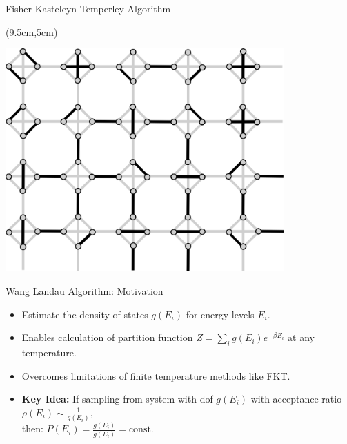 \documentclass{dfki}
\begin{document}
\begin{frame}{Fisher Kasteleyn Temperley Algorithm}
{\begin{textblock*}{5cm}
\begin{center}
			\end{center}
		\end{textblock*}
		\begin{textblock*}{5cm}(9.5cm,5cm)
			\begin{center}
				\includegraphics[width=0.8\textwidth]{fig/dimer_cover.png}
			\end{center}
		\end{textblock*}
	}
\end{frame}


\begin{frame}{Wang Landau Algorithm: Motivation}
	\begin{itemize}
	\item Estimate the density of states $g(E_i)$ for energy levels $E_i$.
	\item Enables calculation of partition function $Z = \sum_{i} g(E_i) e^{-\beta E_i}$ at any temperature.
	\item Overcomes limitations of finite temperature methods like FKT.
	\item \textbf{Key Idea:} If sampling from system with dof $g(E_i)$ with acceptance ratio $\rho(E_i)\sim\frac{1}{g(E_i)}$,\\
	 then: $P(E_{i})=\frac{g(E_i)}{g(E_i)}=\text{const.}$
	\end{itemize}
	\end{frame}
\end{document}
